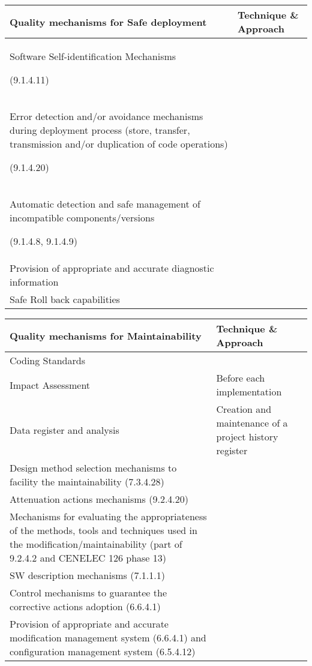 \documentclass{template/openetcs_article}
\begin{document}
\begin{flushleft}
\tablefirsthead{}
\tablehead{}
\tabletail{}
\tablelasttail{}
\begin{supertabular}{|m{8cm}|m{7cm}|}
\hline
{}
Quality mechanisms for Safe deployment &
Technique \& Approach\\\hline
Software Self-identification Mechanisms

(9.1.4.11) &
~
\\\hline
Error detection and/or avoidance mechanisms during deployment process (store, transfer, transmission and/or duplication of code operations)

(9.1.4.20) &
~
\\\hline
Automatic detection and safe management of incompatible components/versions

(9.1.4.8, 9.1.4.9) &
~
\\\hline
Provision of appropriate and accurate diagnostic information &
~
\\\hline
Safe Roll back capabilities  &
~
\\\hline
\end{supertabular}
\end{flushleft}

\begin{flushleft}
\tablefirsthead{}
\tablehead{}
\tabletail{}
\tablelasttail{}
\begin{supertabular}{|m{8cm}|m{7cm}|}
\hline
{}
Quality mechanisms for Maintainability &
Technique \& Approach\\\hline
Coding Standards &
~
\\\hline
Impact Assessment &
Before each implementation\\\hline
Data register and analysis &
Creation and maintenance of a project history register\\\hline
Design method selection mechanisms to facility the maintainability (7.3.4.28) &
~
\\\hline
Attenuation actions mechanisms (9.2.4.20) &
~
\\\hline
Mechanisms for evaluating the appropriateness of the methods, tools and techniques used in the modification/maintainability (part of 9.2.4.2 and CENELEC 126 phase 13) &
~
\\\hline
SW description mechanisms (7.1.1.1) &
~
\\\hline
Control mechanisms to guarantee the corrective actions adoption (6.6.4.1) &
~
\\\hline
Provision of appropriate and accurate modification management system (6.6.4.1) and configuration management system (6.5.4.12) &
~
\\\hline
\end{supertabular}
\end{flushleft}

\nocite{EN50126,EN50128,EN50129,EN61508,200857EC,201118EU,201288EU}
\nocite{pichler2010,monin2008,schwaber2008,subset026,subset036,subset076,fpp}



\end{document}
